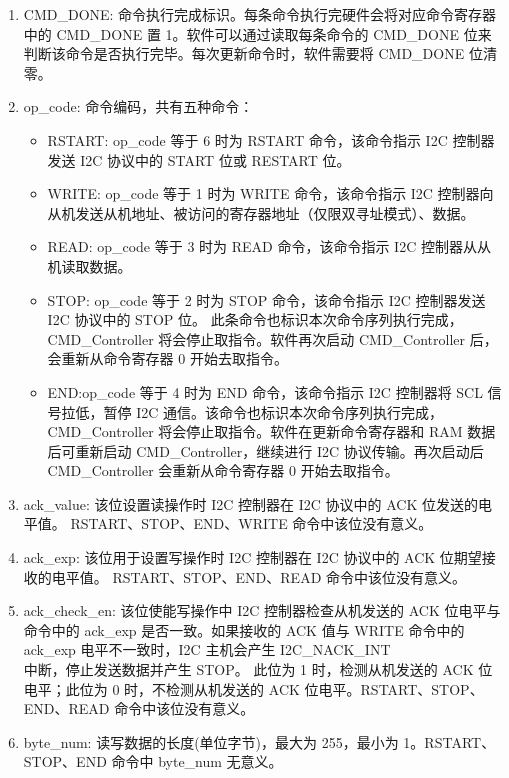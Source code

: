 \documentclass[main\_\_CN.tex]{subfiles}
\begin{document}
\begin{enumerate}

\item CMD\_DONE: 命令执行完成标识。每条命令执行完硬件会将对应命令寄存器中的 CMD\_DONE 置 1。软件可以通过读取每条命令的 CMD\_DONE 位来判断该命令是否执行完毕。每次更新命令时，软件需要将 CMD\_DONE 位清零。

\item op\_code: 命令编码，共有五种命令：

\begin{itemize}
    \item RSTART: op\_code 等于 6 时为 RSTART 命令，该命令指示 I2C 控制器发送 I2C 协议中的 START 位或 RESTART 位。
    
    \item WRITE: op\_code 等于 1 时为 WRITE 命令，该命令指示 I2C 控制器向从机发送从机地址、被访问的寄存器地址（仅限双寻址模式）、数据。
    
    \item READ: op\_code 等于 3 时为 READ 命令，该命令指示 I2C 控制器从从机读取数据。
    
    \item STOP: op\_code 等于 2 时为 STOP 命令，该命令指示 I2C 控制器发送 I2C 协议中的 STOP 位。 此条命令也标识本次命令序列执行完成，CMD\_Controller 将会停止取指令。软件再次启动 CMD\_Controller 后，会重新从命令寄存器 0 开始去取指令。
    
    \item END:op\_code 等于 4 时为 END 命令，该命令指示 I2C 控制器将 SCL 信号拉低，暂停 I2C 通信。该命令也标识本次命令序列执行完成，CMD\_Controller 将会停止取指令。软件在更新命令寄存器和 RAM 数据后可重新启动 CMD\_Controller，继续进行 I2C 协议传输。再次启动后 CMD\_Controller 会重新从命令寄存器 0 开始去取指令。 
    
\end{itemize}

\item ack\_value: 该位设置读操作时 I2C 控制器在 I2C 协议中的 ACK 位发送的电平值。 RSTART、STOP、END、WRITE 命令中该位没有意义。

\item ack\_exp: 该位用于设置写操作时 I2C 控制器在 I2C 协议中的 ACK 位期望接收的电平值。 RSTART、STOP、END、READ 命令中该位没有意义。

\item ack\_check\_en: 该位使能写操作中 I2C 控制器检查从机发送的 ACK 位电平与命令中的 ack\_exp 是否一致。如果接收的 ACK 值与 WRITE 命令中的 ack\_exp 电平不一致时，I2C 主机会产生 I2C\_NACK\_INT\\ 中断，停止发送数据并产生 STOP。 此位为 1 时，检测从机发送的 ACK 位电平；此位为 0 时，不检测从机发送的 ACK 位电平。RSTART、STOP、END、READ 命令中该位没有意义。

\item byte\_num: 读写数据的长度(单位字节)，最大为 255，最小为 1。RSTART、STOP、END 命令中 byte\_num 无意义。

\end{enumerate}
\end{document}
